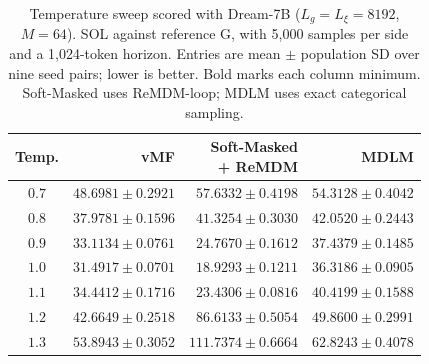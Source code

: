 \begin{table}
  \centering
  \footnotesize
  \setlength{\tabcolsep}{2.5pt}
  \renewcommand{\arraystretch}{1.12}
  \begin{tabular}{@{}crrr@{}}
    \toprule
    Temp. & vMF & \shortstack{Soft-Masked\\+ ReMDM} & MDLM \\
    \midrule
    $0.7$ & $48.6981 \pm 0.2921$ & $57.6332 \pm 0.4198$ & $54.3128 \pm 0.4042$ \\
    $0.8$ & $37.9781 \pm 0.1596$ & $41.3254 \pm 0.3030$ & $42.0520 \pm 0.2443$ \\
    $0.9$ & $33.1134 \pm 0.0761$ & $24.7670 \pm 0.1612$ & $37.4379 \pm 0.1485$ \\
    $1.0$ & $\mathbf{31.4917 \pm 0.0701}$ & $\mathbf{18.9293 \pm 0.1211}$ & $\mathbf{36.3186 \pm 0.0905}$ \\
    $1.1$ & $34.4412 \pm 0.1716$ & $23.4306 \pm 0.0816$ & $40.4199 \pm 0.1588$ \\
    $1.2$ & $42.6649 \pm 0.2518$ & $86.6133 \pm 0.5054$ & $49.8600 \pm 0.2991$ \\
    $1.3$ & $53.8943 \pm 0.3052$ & $111.7374 \pm 0.6664$ & $62.8243 \pm 0.4078$ \\
    \bottomrule
  \end{tabular}
  \caption{\footnotesize Temperature sweep scored with Dream-7B ($L_g=L_\xi=8192$, $M=64$).
  SOL against reference G, with 5,000 samples per side and a 1,024-token horizon.
  Entries are mean $\pm$ population SD over nine seed pairs; lower is better.
  Bold marks each column minimum. Soft-Masked uses ReMDM-loop;
  MDLM uses exact categorical sampling.}
  \label{tab:owt-temperature-dream8k}
\end{table}
